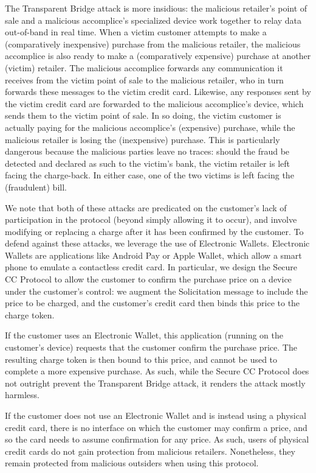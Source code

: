 The Transparent Bridge attack is more insidious:
    the malicious retailer's point of sale and a malicious accomplice's specialized device work together to relay data out-of-band in real time.
When a victim customer attempts to make a (comparatively inexpensive) purchase from the malicious retailer,
    the malicious accomplice is also ready to make a (comparatively expensive) purchase at another (victim) retailer.
The malicious accomplice forwards any communication it receives from the victim point of sale to the malicious retailer,
    who in turn forwards these messages to the victim credit card.
Likewise, any responses sent by the victim credit card are forwarded to the malicious accomplice's device, which sends them to the victim point of sale.
In so doing, the victim customer is actually paying for the malicious accomplice's (expensive) purchase, while the malicious retailer is losing the (inexpensive) purchase.
This is particularly dangerous because the malicious parties leave no traces:
    should the fraud be detected and declared as such to the victim's bank, the victim retailer is left facing the charge-back.
In either case, one of the two victims is left facing the (fraudulent) bill.

We note that both of these attacks are predicated on the customer's lack of participation in the protocol (beyond simply allowing it to occur),
    and involve modifying or replacing a charge after it has been confirmed by the customer.
To defend against these attacks, we leverage the use of Electronic Wallets.
Electronic Wallets are applications like Android Pay or Apple Wallet, which allow a smart phone to emulate a contactless credit card.
In particular, we design the Secure CC Protocol to allow the customer to confirm the purchase price on a device under the customer's control:
    we augment the Solicitation message to include the price to be charged, and the customer's credit card then binds this price to the charge token.

If the customer uses an Electronic Wallet, this application (running on the customer's device) requests that the customer confirm the purchase price.
The resulting charge token is then bound to this price, and cannot be used to complete a more expensive purchase.
As such, while the Secure CC Protocol does not outright prevent the Transparent Bridge attack, it renders the attack mostly harmless.

If the customer does not use an Electronic Wallet and is instead using a physical credit card,
    there is no interface on which the customer may confirm a price, and so the card needs to assume confirmation for any price.
As such, users of physical credit cards do not gain protection from malicious retailers.
Nonetheless, they remain protected from malicious outsiders when using this protocol.

